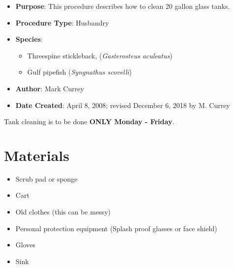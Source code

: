 \documentclass[
  letterpaper,
  DIV=11,
  numbers=noendperiod]{scrreprt}
\providecommand{\tightlist}{%
  \setlength{\itemsep}{0pt}\setlength{\parskip}{0pt}}\usepackage{longtable,booktabs,array}
\begin{document}
\begin{itemize}
\tightlist
\item
  \textbf{Purpose}: This procedure describes how to clean 20 gallon
  glass tanks.
\item
  \textbf{Procedure Type}: Husbandry
\item
  \textbf{Species}:

  \begin{itemize}
  \tightlist
  \item
    Threespine stickleback, (\emph{Gasterosteus aculeatus})
  \item
    Gulf pipefish (\emph{Syngnathus scovelli})
  \end{itemize}
\item
  \textbf{Author}: Mark Currey
\item
  \textbf{Date Created}: April 8, 2008; revised December 6, 2018 by M.
  Currey
\end{itemize}

\begin{tcolorbox}[enhanced jigsaw, rightrule=.15mm, title=\textcolor{quarto-callout-important-color}{\faExclamation}\hspace{0.5em}{This is important}, titlerule=0mm, opacitybacktitle=0.6, toprule=.15mm, bottomrule=.15mm, opacityback=0, left=2mm, colframe=quarto-callout-important-color-frame, breakable, coltitle=black, colback=white, colbacktitle=quarto-callout-important-color!10!white, bottomtitle=1mm, leftrule=.75mm, toptitle=1mm, arc=.35mm]

Tank cleaning is to be done \textbf{ONLY Monday - Friday}.

\end{tcolorbox}

\hypertarget{materials-28}{%
\section{Materials}\label{materials-28}}

\begin{itemize}
\tightlist
\item
  Scrub pad or sponge
\item
  Cart
\item
  Old clothes (this can be messy)
\item
  Personal protection equipment (Splash proof glasses or face shield)
\item
  Gloves
\item
  Sink
\end{itemize}
\end{document}
